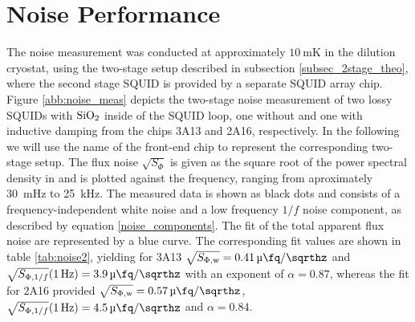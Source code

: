  




\section{Noise Performance} \label{sec_noise_results}


The noise measurement was conducted at approximately $\qty{10}{\milli\kelvin}$ in the dilution cryostat, using the two-stage setup described in subsection \ref{subsec_2stage_theo}, where the second stage SQUID is provided by a separate SQUID array chip. Figure \ref{abb:noise_meas} depicts the two-stage noise measurement of two lossy SQUIDs with ${\rm SiO_2}$ inside of the SQUID loop, one without and one with inductive damping from the chips 3A13 and 2A16, respectively. In the following we will use the name of the front-end chip to represent the corresponding two-stage setup. The flux noise $\sqrt{S_\Phi}$ is given as the square root of the power spectral density in and is plotted against the frequency, ranging from aproximately \qty{30}{\milli\hertz} to \qty{25}{\kHz}. The measured data is shown as black dots and consists of a frequency-independent white noise and a low frequency $1/f$ noise component, as described by equation \ref{noise_components}. The fit of the total apparent flux noise are represented by a blue curve. The corresponding fit values are shown in table \ref{tab:noise2}, yielding for 3A13 $\sqrt{S_{\rm \Phi,w}}=\qty{0.41}{\micro\fq\per\sqrthz}$ and $\sqrt{S_{{\rm \Phi},1/f}}(\qty{1}{\Hz})=\qty{3.9}{\micro\fq\per\sqrthz}$ with an exponent of $\alpha=0.87$, whereas the fit for 2A16 provided $\sqrt{S_{\rm \Phi,w}}=\qty{0.57}{\micro\fq\per\sqrthz}$, $\sqrt{S_{{\rm \Phi},1/f}}(\qty{1}{\Hz})=\qty{4.5}{\micro\fq\per\sqrthz}$ and $\alpha=0.84$.

